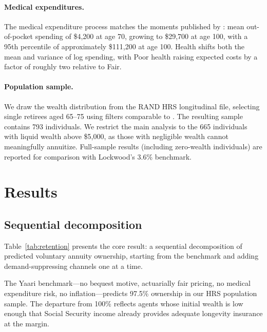 \documentclass[12pt]{article}
\begin{document}
\paragraph{Medical expenditures.} The medical expenditure process matches the moments published by \citet{jones2018}: mean out-of-pocket spending of \$4,200 at age 70, growing to \$29,700 at age 100, with a 95th percentile of approximately \$111,200 at age 100. Health shifts both the mean and variance of log spending, with Poor health raising expected costs by a factor of roughly two relative to Fair.

\paragraph{Population sample.} We draw the wealth distribution from the RAND HRS longitudinal file, selecting single retirees aged 65--75 using filters comparable to \citet{lockwood2012}. The resulting sample contains 793 individuals. We restrict the main analysis to the 665 individuals with liquid wealth above \$5,000, as those with negligible wealth cannot meaningfully annuitize. Full-sample results (including zero-wealth individuals) are reported for comparison with Lockwood's 3.6\% benchmark.


\section{Results}
\label{sec:results}

\subsection{Sequential decomposition}
\label{sec:decomposition}

Table~\ref{tab:retention} presents the core result: a sequential decomposition of predicted voluntary annuity ownership, starting from the \citet{yaari1965} benchmark and adding demand-suppressing channels one at a time.



The Yaari benchmark---no bequest motive, actuarially fair pricing, no medical expenditure risk, no inflation---predicts 97.5\% ownership in our HRS population sample. The departure from 100\% reflects agents whose initial wealth is low enough that Social Security income already provides adequate longevity insurance at the margin.
\end{document}
